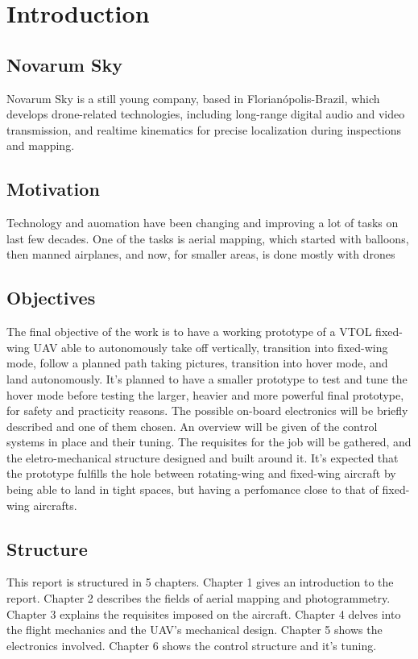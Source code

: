

\chapter{Introduction} \label{chap:1}


\section{Novarum Sky}
Novarum Sky is a still young company, based in Florianópolis-Brazil, which develops drone-related technologies, including long-range digital audio and video transmission, and realtime kinematics for precise localization during inspections and mapping.

\section{Motivation}
Technology and auomation have been changing and improving a lot of tasks on last few decades.
%
One of the tasks is aerial mapping, which started with balloons, then manned airplanes, and now, for smaller areas, is done mostly with drones
%

%
%
% 
%
%


\section{Objectives}

%
The final objective of the work is to have a working prototype of a VTOL fixed-wing UAV able to autonomously take off vertically, transition into fixed-wing mode, follow a planned path taking pictures, transition into hover mode, and land autonomously.
%
It's planned to have a smaller prototype to test and tune the hover mode before testing the larger, heavier and more powerful final prototype, for safety and practicity reasons.
%
The possible on-board electronics will be briefly described and one of them chosen.
%
An overview will be given of the control systems in place and their tuning.
%
The requisites for the job will be gathered, and the eletro-mechanical structure designed and built around it.
%
It's expected that the prototype fulfills the hole between rotating-wing and fixed-wing aircraft by being able to land in tight spaces, but having a perfomance close to that of fixed-wing aircrafts. 

%
\section{Structure}

%
This report is structured in 5 chapters.
%
Chapter 1 gives an introduction to the report.
%
Chapter 2 describes the fields of aerial mapping and photogrammetry.
%
Chapter 3 explains the requisites imposed on the aircraft.
%
Chapter 4 delves into the flight mechanics and the UAV's mechanical design.
%
Chapter 5 shows the electronics involved.
%
Chapter 6 shows the control structure and it's tuning.


